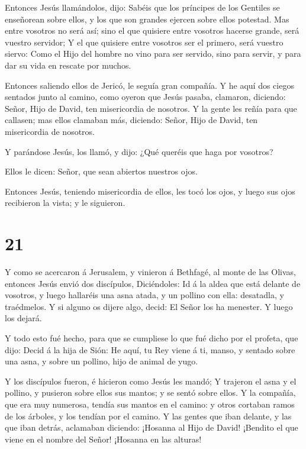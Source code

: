  Entonces Jesús llamándolos, dijo: Sabéis que los príncipes
de los Gentiles se enseñorean sobre ellos, y los que son grandes ejercen
sobre ellos potestad.  Mas entre vosotros no será así; sino
el que quisiere entre vosotros hacerse grande, será vuestro servidor;
 Y el que quisiere entre vosotros ser el primero, será
vuestro siervo:  Como el Hijo del hombre no vino para ser
servido, sino para servir, y para dar su vida en rescate por muchos.

 Entonces saliendo ellos de Jericó, le seguía gran
compañía.  Y he aquí dos ciegos sentados junto al camino,
como oyeron que Jesús pasaba, clamaron, diciendo: Señor, Hijo de David,
ten misericordia de nosotros.  Y la gente les reñía para
que callasen; mas ellos clamaban más, diciendo: Señor, Hijo de David,
ten misericordia de nosotros.

 Y parándose Jesús, los llamó, y dijo: ¿Qué queréis que
haga por vosotros?

 Ellos le dicen: Señor, que sean abiertos nuestros ojos.

 Entonces Jesús, teniendo misericordia de ellos, les tocó
los ojos, y luego sus ojos recibieron la vista; y le siguieron.

\hypertarget{section-20}{%
\section{21}\label{section-20}}

 Y como se acercaron á Jerusalem, y vinieron á Bethfagé, al
monte de las Olivas, entonces Jesús envió dos discípulos, 
Diciéndoles: Id á la aldea que está delante de vosotros, y luego
hallaréis una asna atada, y un pollino con ella: desatadla, y
traédmelos.  Y si alguno os dijere algo, decid: El Señor los
ha menester. Y luego los dejará.

 Y todo esto fué hecho, para que se cumpliese lo que fué
dicho por el profeta, que dijo:  Decid á la hija de Sión: He
aquí, tu Rey viene á ti, manso, y sentado sobre una asna, y sobre un
pollino, hijo de animal de yugo.

 Y los discípulos fueron, é hicieron como Jesús les mandó;
 Y trajeron el asna y el pollino, y pusieron sobre ellos sus
mantos; y se sentó sobre ellos.  Y la compañía, que era muy
numerosa, tendía sus mantos en el camino: y otros cortaban ramos de los
árboles, y los tendían por el camino.  Y las gentes que iban
delante, y las que iban detrás, aclamaban diciendo: ¡Hosanna al Hijo de
David! ¡Bendito el que viene en el nombre del Señor! ¡Hosanna en las
alturas!

